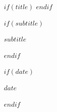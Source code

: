 $if(title)$
$endif$

$if(subtitle)$
\begin{center}
  {\large\itshape $subtitle$}
\end{center}
$endif$

$if(date)$
\begin{center}
  {\small $date$}
\end{center}
$endif$

\bigskip
